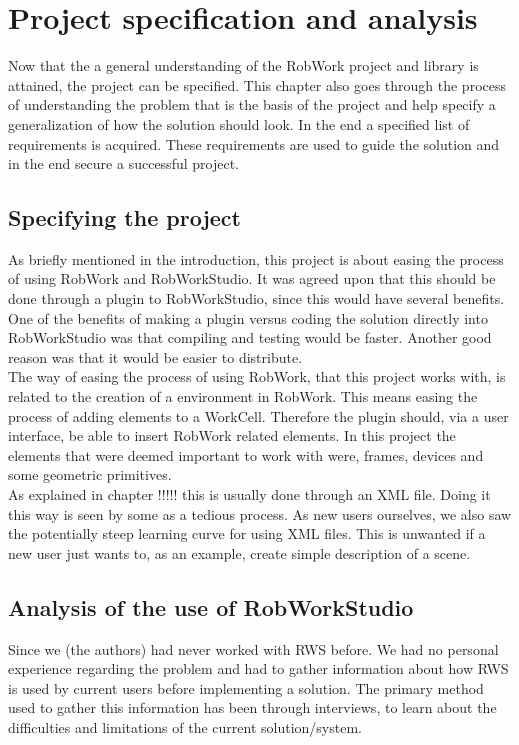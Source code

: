 \section{Project specification and analysis}
Now that the a general understanding of the RobWork project and library is attained, the project can be specified. This chapter also goes through the process of understanding the problem that is the basis of the project and help specify a generalization of how the solution should look. In the end a specified list of requirements is acquired. These requirements are used to guide the solution and in the end secure a successful project.

\subsection{Specifying the project}
As briefly mentioned in the introduction, this project is about easing the process of using RobWork and RobWorkStudio. It was agreed upon that this should be done through a plugin to RobWorkStudio, since this would have several benefits. One of the benefits of making a plugin versus coding the solution directly into RobWorkStudio was that compiling and testing would be faster. Another good reason was that it would be easier to distribute.\\

The way of easing the process of using RobWork, that this project works with, is related to the creation of a environment in RobWork. This means easing the process of adding elements to a WorkCell. Therefore the plugin should, via a user interface, be able to insert RobWork related elements. In this project the elements that were deemed important to work with were, frames, devices and some geometric primitives.\\

As explained in chapter !!!!! this is usually done through an XML file. Doing it this way is seen by some as a tedious process. As new users ourselves, we also saw the potentially steep learning curve for using XML files. This is unwanted if a new user just wants to, as an example, create simple description of a scene.

\subsection{Analysis of the use of RobWorkStudio}
Since we (the authors) had never worked with RWS before. We had no personal experience regarding the problem and had to gather information about how RWS is used by current users before implementing a solution. The primary method used to gather this information has been through interviews, to learn about the difficulties and limitations of the current solution/system.

